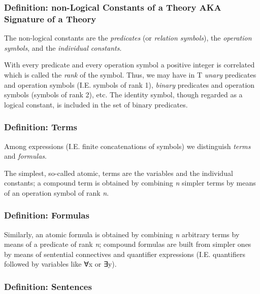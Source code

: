 \hypertarget{definition-non-logical-constants-of-a-theory-aka-signature-of-a-theory}{%
\subsubsection{Definition: non-Logical Constants of a Theory AKA
Signature of a
Theory}\label{definition-non-logical-constants-of-a-theory-aka-signature-of-a-theory}}

The non-logical constants are the \emph{predicates} (or \emph{relation
symbols}), the \emph{operation symbols}, and the \emph{individual
constants}.

With every predicate and every operation symbol a positive integer is
correlated which is called the \emph{rank} of the symbol. Thus, we may
have in T \emph{unary} predicates and operation symbols (I.E. symbols of
rank 1), \emph{binary} predicates and operation symbols (symbols of rank
2), etc. The identity symbol, though regarded as a logical constant, is
included in the set of binary predicates.

\hypertarget{definition-terms}{%
\subsubsection{Definition: Terms}\label{definition-terms}}

Among expressions (I.E. finite concatenations of symbols) we distinguish
\emph{terms} and \emph{formulas}.

The simplest, so-called atomic, terms are the variables and the
individual constants; a compound term is obtained by combining \emph{n}
simpler terms by means of an operation symbol of rank \emph{n}.

\hypertarget{definition-formulas}{%
\subsubsection{Definition: Formulas}\label{definition-formulas}}

Similarly, an atomic formula is obtained by combining \emph{n} arbitrary
terms by means of a predicate of rank \emph{n}; compound formulas are
built from simpler ones by means of sentential connectives and
quantifier expressions (I.E. quantifiers followed by variables like ∀x
or ∃y).

\hypertarget{definition-sentences}{%
\subsubsection{Definition: Sentences}\label{definition-sentences}}


